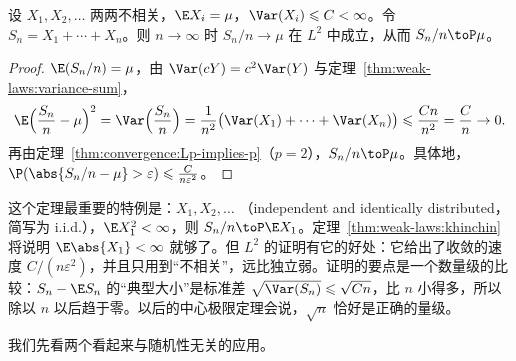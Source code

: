 \begin{theorem}[$L^2$ 弱大数定律]\label{thm:weak-laws:L2}
设 $X_1,X_2,\dots$ 两两不相关，$\E X_i=\mu$，$\Var(X_i)\leqslant C<\infty$。令 $S_n=X_1+\cdots+X_n$。则 $n\to\infty$ 时 $S_n/n\to\mu$ 在 $L^2$ 中成立，从而 $S_n/n\toP\mu$。
\end{theorem}
\begin{proof}
$\E(S_n/n)=\mu$，由 $\Var(cY)=c^2\Var(Y)$ 与定理~\ref{thm:weak-laws:variance-sum}，
\[
\E\Bigl(\frac{S_n}n-\mu\Bigr)^2=\Var\Bigl(\frac{S_n}n\Bigr)=\frac1{n^2}\bigl(\Var(X_1)+\cdots+\Var(X_n)\bigr)\leqslant\frac{Cn}{n^2}=\frac Cn\to0 .
\]
再由定理~\ref{thm:convergence:Lp-implies-p}（$p=2$），$S_n/n\toP\mu$。具体地，$\P(\abs{S_n/n-\mu}>\varepsilon)\leqslant\frac C{n\varepsilon^2}$。
\end{proof}

\begin{remark}
这个定理最重要的特例是：$X_1,X_2,\dots$ （independent and identically distributed，简写为 i.i.d.），$\E X_1^2<\infty$，则 $S_n/n\toP \E X_1$。定理~\ref{thm:weak-laws:khinchin} 将说明 $\E\abs{X_1}<\infty$ 就够了。但 $L^2$ 的证明有它的好处：它给出了收敛的速度 $C/(n\varepsilon^2)$，并且只用到“不相关”，远比独立弱。证明的要点是一个数量级的比较：$S_n-\E S_n$ 的“典型大小”是标准差 $\sqrt{\Var(S_n)}\leqslant\sqrt{Cn}$，比 $n$ 小得多，所以除以 $n$ 以后趋于零。以后的中心极限定理会说，$\sqrt n$ 恰好是正确的量级。
\end{remark}

我们先看两个看起来与随机性无关的应用。

